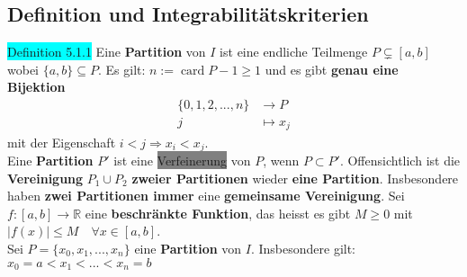 \documentclass[landscape, 10pt]{article}
\newcommand{\R}{\mathbb{R}}
\begin{document}
\begin{multicols}{3}
       \subsection{Definition und Integrabilitätskriterien}
              \colorbox{cyan}{Definition 5.1.1} 
                     Eine \textbf{Partition} von 
                     \textcolor{NavyBlue}{$I$} 
                     ist eine endliche Teilmenge 
                     \textcolor{NavyBlue}{$P\subsetneq[a,b]$} 
                     wobei \textcolor{NavyBlue}{
                     $\{a,b\}\subseteq P$}. 
                     Es gilt: 
                     \textcolor{NavyBlue}{
                     $n:=\operatorname{card} P-1\geqslant1$} 
                     und es gibt \textbf{genau eine Bijektion}
                     \begin{align*}
                            \{0,1,2,...,n\}&\longrightarrow P\\
                            j&\mapsto x_j
                     \end{align*}
                     mit der Eigenschaft 
                     \textcolor{NavyBlue}{
                     $i<j\Longrightarrow x_i<x_j$}.\\
              Eine \textbf{Partition} 
                     \textcolor{NavyBlue}{$P'$ }ist eine 
                     \colorbox{gray}{Verfeinerung} von 
                     \textcolor{NavyBlue}{$P$}, 
                     wenn \textcolor{NavyBlue}{$P\subset P'$}. 
                     Offensichtlich ist die \textbf{Vereinigung} 
                     \textcolor{NavyBlue}{$P_1\cup P_2$} 
                     \textbf{zweier Partitionen} 
                     wieder \textbf{eine Partition}. Insbesondere 
                     haben \textbf{zwei Partitionen immer} 
                     eine \textbf{gemeinsame Vereinigung}.
              Sei \textcolor{NavyBlue}{
                     $f:[a,b]\longrightarrow\R$} eine 
                     \textbf{beschränkte Funktion}, 
                     das heisst es gibt 
                     \textcolor{NavyBlue}{$M\geqslant0$} mit 
                     \textcolor{NavyBlue}{
                     $|f(x)|\leqslant M\quad
                     \forall x\in[a,b]$}.\\
              Sei \textcolor{NavyBlue}{
                     $P=\{x_0,x_1,...,x_n\}$} eine 
                     \textbf{Partition} von 
                     \textcolor{NavyBlue}{$I$}. 
                     Insbesondere gilt: 
                     \textcolor{NavyBlue}{
                     $x_0=a<x_1<...<x_n=b$}\\

\end{multicols}
\end{document}
